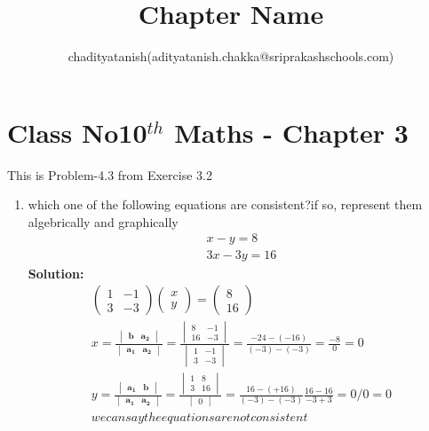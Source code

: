 \documentclass[12pt]{article}
\title{Chapter Name}
\author{chadityatanish(adityatanish.chakka@sriprakashschools.com)}
\newcommand{\myvec}[1]{\ensuremath{\begin{pmatrix}#1\end{pmatrix}}}
\newcommand{\mydet}[1]{\ensuremath{\begin{vmatrix}#1\end{vmatrix}}}
\newcommand{\solution}{\noindent \textbf{Solution: }}
\let\vec\mathbf
\begin{document}
\maketitle
\section*{Class No10$^{th}$ Maths - Chapter 3}
This is Problem-4.3 from Exercise 3.2
\begin{enumerate}
\item which one of the following equations are consistent?if so, represent them algebrically and graphically
\begin{align}
x-y=8\\
3x-3y=16 
\end{align}
\solution\\
\begin{align}
\myvec{1&-1\\3&-3}\myvec{x\\y} = \myvec{8\\16}\\
x=\frac{\mydet{\vec{b} & \vec{a_2}}}{\mydet{ \vec{a_1} &\vec{a_2} }}=
\frac{\mydet{8 & -1 \\ 16 & -3}}{\mydet{1&-1 \\ 3&-3}}=
\frac{-24 - (-16)}{(-3) - (-3)}=\frac{-8}{0}=0 \\
y=\frac{\mydet{  \vec{a_1} & \vec{b}}}{\mydet{ \vec{a_1} &\vec{a_2} }}=
\frac{\mydet{1 & 8\\ 3 & 16}}{\mydet{0}}= 
\frac{16 - (+16)}{(-3) - (-3)}
\frac{16-16}{-3+3} = 0/0 = 0\\
we can say the equations are not consistent
\end{align}
\end{enumerate}
\end{document}
